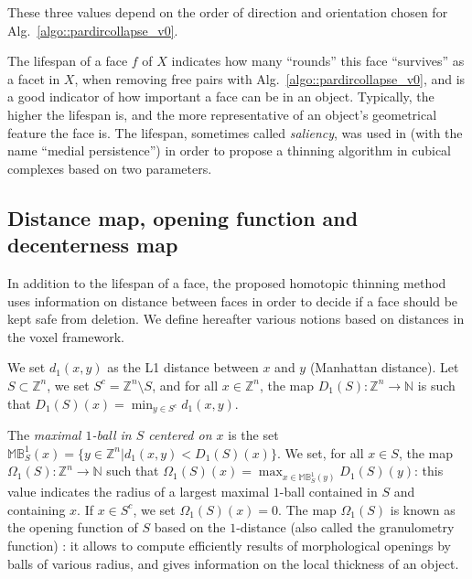 \documentclass[final,envcountsame]{llncs}
\def\OneBall#1{\mathbb{B}^{1}_{#1}}
\def\MaxOneBall#1{\mathbb{M}\OneBall{#1}}
\def\mydist1{D_1}
\def\mydd1{\Omega_1}
\def\dist1{d_1}
\def\Dist1#1{\mydist1(#1)}
\def\DD1#1{\mydd1(#1)}
\def\myem#1{{\em #1}}
\def\quotes#1{``#1''}
\def\Nset{\mathbb{N}}
\def\Zset{\Z}
\def\Nset{\mathbb{N}}
\def\Z{\mathbb{Z}}
\newcommand{\Compl}[1]{#1^c}
\begin{document}
These three values depend on the order of direction and orientation chosen for Alg.~\ref{algo::pardircollapse_v0}.

The lifespan of a face $f$ of $X$ indicates how many \quotes{rounds} this face \quotes{survives} as a facet in $X$, when removing free pairs with Alg.~\ref{algo::pardircollapse_v0}, and is a good indicator of how important a face can be in an object. Typically, the higher the lifespan is, and the more representative of an object's geometrical feature the face is. The lifespan, sometimes called \myem{saliency}, was used in \cite{Liu2009} (with the name \quotes{medial persistence}) in order to propose a thinning algorithm in cubical complexes based on two parameters.



\subsection{Distance map, opening function and decenterness map}
\label{subsec::distmap}
In addition to the lifespan of a face, the proposed homotopic thinning method uses information on distance between faces in order to decide if a face should be kept safe from deletion. We define hereafter various notions based on distances in the voxel framework.



We set $\dist1(x,y)$ as the L1 distance between $x$ and $y$ (Manhattan distance). Let $S \subset \Zset^n$, we set $\Compl{S} = \Zset^n \setminus S$, and for all $x \in \Zset^n$, the map $\Dist1{S}: \Zset^n \rightarrow \Nset$ is such that $\Dist1{S}(x) = \displaystyle \min_{y \in \Compl{S}} \dist1(x,y)$. 

The \myem{maximal $1$-ball in $S$ centered on $x$} is the set $\MaxOneBall{S}(x)=\{y \in \Zset^n | \dist1(x,y) < \Dist1{S}(x)\}$.
We set, for all $x \in S$, the map $\DD1{S}: \Zset^n \rightarrow \Nset$ such that $\DD1{S}(x) = \displaystyle \max_{x \in \MaxOneBall{S}(y)} \Dist1{S}(y)$: this value indicates the radius of a largest maximal $1$-ball contained in $S$ and containing $x$. If $x \in \Compl{S}$, we set $\DD1{S}(x) = 0$. The map $\DD1{S}$ is known as the opening function of $S$ based on the $1$-distance (also called the granulometry function) \cite{Matheron67}: it allows to compute efficiently results of morphological openings by balls of various radius, and gives information on the local thickness of an object.
\end{document}
